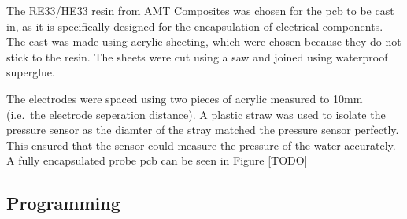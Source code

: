 The RE33/HE33 resin from AMT Composites was chosen for the \gls{pcb} to be cast in, as it is specifically designed for the encapsulation of electrical components.
The cast was made using acrylic sheeting, which were chosen because they do not stick to the resin.
The sheets were cut using a saw and joined using waterproof superglue.

The electrodes were spaced using two pieces of acrylic measured to 10mm (i.e.~the electrode seperation distance).
A plastic straw was used to isolate the pressure sensor as the diamter of the stray matched the pressure sensor perfectly.
This ensured that the sensor could measure the pressure of the water accurately.
A fully encapsulated probe \gls{pcb} can be seen in Figure [TODO]

\subsection{Programming}
